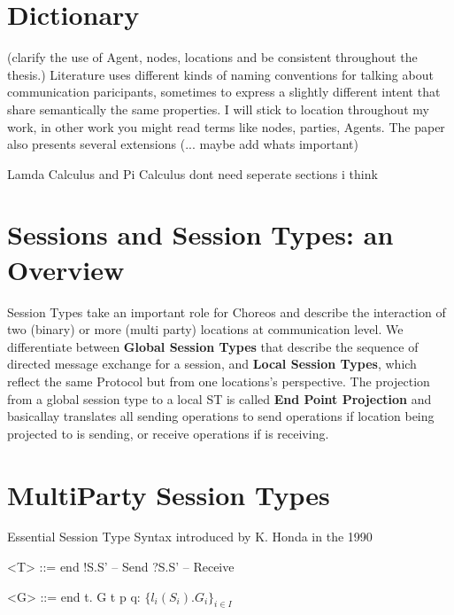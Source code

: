 \documentclass[
	ngerman,
	ruledheaders=section,%
	class=report,%
	thesis={type=master},%
	accentcolor=9c,%
	custommargins=true,%
	marginpar=false,%
	parskip=half-,%
	fontsize=11pt,%
]{tudapub}
\begin{document}
\section{Dictionary}

(clarify the use of Agent, nodes, locations and be consistent throughout the thesis.)
Literature uses different kinds of naming conventions for talking about communication paricipants, sometimes to express a slightly different intent that share semantically the same properties. I will stick to location throughout my work, in other work you might read terms like nodes, parties, Agents. The paper also presents several extensions (... maybe add whats important)

Lamda Calculus and Pi Calculus
dont need seperate sections i think

\section{Sessions and Session Types:
an Overview}
Session Types take an important role for Choreos and describe the interaction of two (binary) or more (multi party) locations at communication level. We differentiate between \textbf{Global Session Types} that describe the sequence of directed message exchange for a session, and \textbf{Local Session Types}, which reflect the same Protocol but from one locations's perspective. The projection from a global session type to a local ST is called \textbf{End Point Projection} and basicallay translates all sending operations to send operations if location being projected to is sending, or receive operations if is receiving.

\section{MultiParty Session Types}


Essential Session Type Syntax introduced by K. Honda in the 1990

\begin{grammar}

<T> ::= end
	\alt !S.S' -- Send
	\alt ?S.S' -- Receive

\end{grammar}

\begin{grammar}
<G> ::= end
	\alt \mu t. G
	\alt t
	\alt p \rightarrow q: $\{l_i(S_i).G_i\}_{i \in I}$

\end{grammar}
\end{document}
